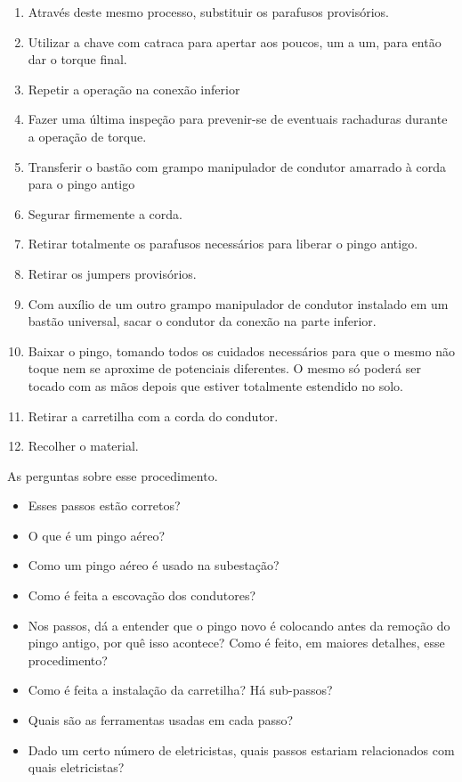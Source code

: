 \begin{enumerate}
\item Através deste mesmo processo, substituir os parafusos provisórios. 
\item Utilizar a chave com catraca para apertar aos poucos, um a um, para então dar o torque final.
\item Repetir a operação na conexão inferior
\item Fazer uma última inspeção para prevenir-se de eventuais rachaduras durante a operação de torque. 
\item Transferir o bastão com grampo manipulador de condutor amarrado à corda para o pingo antigo
\item Segurar firmemente a corda.
\item Retirar totalmente os parafusos necessários para liberar o pingo antigo. 
\item Retirar os jumpers provisórios.
\item Com auxílio de um outro grampo manipulador de condutor instalado em um bastão universal, sacar o condutor da conexão na parte inferior.
\item Baixar o pingo, tomando todos os cuidados necessários para que o mesmo não toque nem se aproxime de potenciais diferentes. O mesmo só poderá ser tocado com as mãos depois que estiver totalmente estendido no solo.
\item Retirar a carretilha com a corda do condutor.
\item Recolher o material.
\end{enumerate}

As perguntas sobre esse procedimento. 

\begin{itemize}
\item Esses passos estão corretos?
\item O que é um pingo aéreo? 
\item Como um pingo aéreo é usado na subestação?
\item Como é feita a escovação dos condutores?
\item Nos passos, dá a entender que o pingo novo é colocando antes da remoção do pingo antigo, por quê isso acontece? Como é feito, em maiores detalhes, esse procedimento?
\item Como é feita a instalação da carretilha? Há sub-passos?
\item Quais são as ferramentas usadas em cada passo?
\item Dado um certo número de eletricistas, quais passos estariam relacionados com quais eletricistas?
\end{itemize}

